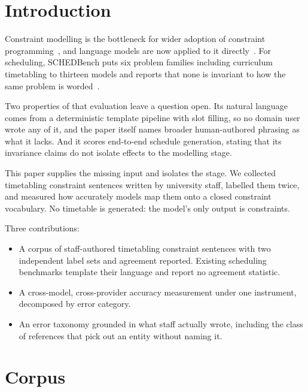\documentclass[sigconf,screen,review,anonymous]{acmart}
\begin{document}
\section{Introduction}

Constraint modelling is the bottleneck for wider adoption of constraint
programming~\cite{michailidis2025cpbench}, and language models are now applied
to it directly~\cite{shi2025constraintllm,ramamonjison2022nl4opt}. For
scheduling, SCHEDBench puts six problem families including curriculum
timetabling to thirteen models and reports that none is invariant to how the
same problem is worded~\cite{sharma2026schedbench}.

Two properties of that evaluation leave a question open. Its natural language
comes from a deterministic template pipeline with slot filling, so no domain
user wrote any of it, and the paper itself names broader human-authored
phrasing as what it lacks. And it scores end-to-end schedule generation,
stating that its invariance claims do not isolate effects to the modelling
stage.

This paper supplies the missing input and isolates the stage. We collected
timetabling constraint sentences written by university staff, labelled them
twice, and measured how accurately models map them onto a closed constraint
vocabulary. No timetable is generated: the model's only output is constraints.

Three contributions:

\begin{itemize}
  \item A corpus of staff-authored timetabling constraint sentences with two
        independent label sets and agreement reported. Existing scheduling
        benchmarks template their language and report no agreement statistic.
  \item A cross-model, cross-provider accuracy measurement under one
        instrument, decomposed by error category.
  \item An error taxonomy grounded in what staff actually wrote, including the
        class of references that pick out an entity without naming it.
\end{itemize}

\section{Corpus}
\end{document}
